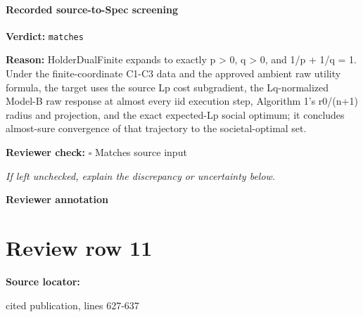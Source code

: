 \documentclass[10pt]{article}
\newcommand{\reviewerbox}{%
  \par\noindent\fbox{\parbox{0.96\linewidth}{\rule{0pt}{0.38in}}}\par
}
\newcommand{\reviewmatch}[1]{%
  \par\noindent\textbf{Reviewer check:} $\square$\; #1\par
  \noindent\emph{If left unchecked, explain the discrepancy or uncertainty below.}\par
}
\begin{document}
\paragraph{Recorded source-to-Spec screening}
\textbf{Verdict:} \texttt{matches}
\\
{\raggedright
\textbf{Reason:} HolderDualFinite expands to exactly p > 0, q > 0, and 1/\allowbreak{}p + 1/\allowbreak{}q = 1.\allowbreak{} Under the finite-\allowbreak{}coordinate C1-\allowbreak{}C3 data and the approved ambient raw utility formula, the target uses the source Lp cost subgradient, the Lq-\allowbreak{}normalized Model-\allowbreak{}B raw response at almost every iid execution step, Algorithm 1's r0/\allowbreak{}(n+1) radius and projection, and the exact expected-\allowbreak{}Lp social optimum;\allowbreak{} it concludes almost-\allowbreak{}sure convergence of that trajectory to the societal-\allowbreak{}optimal set.\allowbreak{}
\par}
\reviewmatch{Matches source input}
\noindent\textbf{Reviewer annotation}\par
\reviewerbox
\clearpage
\hypertarget{source-claim-f197690ced7ff637}{}
\section*{Review row 11}
\textbf{Source locator:} {\footnotesize\raggedright cited publication, lines 627-\allowbreak{}637\par}
\end{document}
